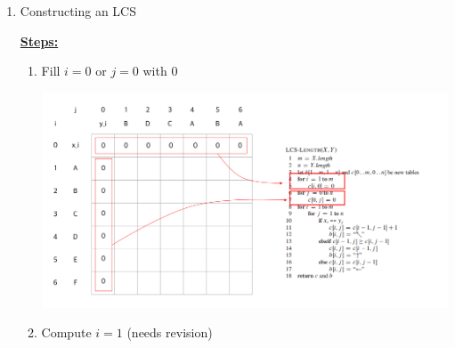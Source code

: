\documentclass[12pt]{article}
\begin{document}
\begin{enumerate}[1.]
\begin{itemize}
\begin{itemize}
\begin{enumerate}[1.]
\begin{itemize}
\begin{lstlisting}[mathescape=true]
                elseif c[i-1, j] $\geq$ c[i,j-1]
                    c[i,j] = c[i,j-1]
                    b[i,j] = '$\uparrow$'

                else
                    c[i,j] = c[i,j-1]
                    b[i,j] = '$\leftarrow$'

        return c and b
    \end{lstlisting}
                \end{itemize}
                \item Constructing an LCS

                \bigskip

                \underline{\textbf{Steps:}}

                \bigskip

                \begin{enumerate}[1)]
                    \item Fill $i = 0$ or $j = 0$ with 0

                    \begin{center}
                    \includegraphics[width=\linewidth]{images/worksheet_3_solution_12.png}
                    \end{center}

                    \item Compute $i = 1$ (needs revision)

                    \bigskip


\end{enumerate}
\end{enumerate}
\end{itemize}
\end{itemize}
\end{enumerate}
\end{document}
